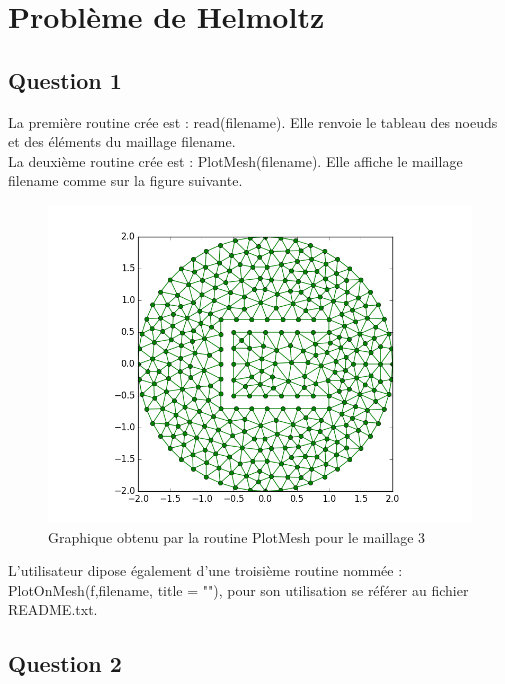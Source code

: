 \documentclass[a4paper,12pt]{article}
\begin{document}
		
 	  \setcounter{page}{1}
		
		
\section{Probl\`eme de Helmoltz}
\subsection{Question 1}

La première routine crée est : read(filename). Elle renvoie le tableau des noeuds et des éléments du maillage filename.\\
La deuxième routine crée est : PlotMesh(filename). Elle affiche le maillage filename comme sur la figure suivante.\\
\begin{figure}[H]
\begin{center}
        \includegraphics[scale = 0.6]{image/Maillage3/figure_1}
\end{center}
\caption{Graphique obtenu par la routine PlotMesh pour le maillage 3}
\end{figure}
L'utilisateur dipose également d'une troisième routine nommée : PlotOnMesh(f,filename, title = ""), pour son utilisation se référer au fichier README.txt.


\subsection{Question 2}
\end{document}
